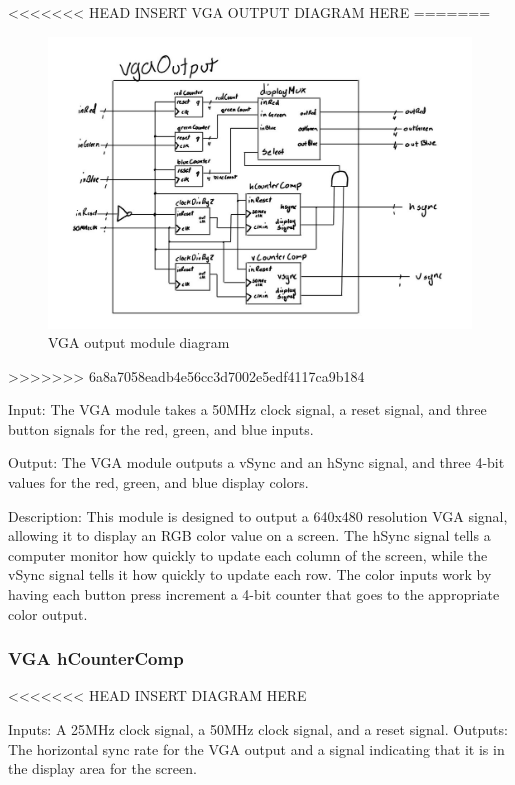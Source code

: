\documentclass[a4paper]{article}
\begin{document}
<<<<<<< HEAD
INSERT VGA OUTPUT DIAGRAM HERE
=======
\begin{figure}[H]
    \includegraphics[width=0.8 \linewidth]{images/vgaOutput.JPG}
    \caption{VGA output module diagram}
    \label{vgaOutputDiagram}
\end{figure}
>>>>>>> 6a8a7058eadb4e56cc3d7002e5edf4117ca9b184

Input: The VGA module takes a 50MHz clock signal, a reset signal, and three button signals for the red, green, and blue inputs.

Output: The VGA module outputs a vSync and an hSync signal, and three 4-bit values for the red, green, and blue display colors.

Description: This module is designed to output a 640x480 resolution VGA signal, allowing it to display an RGB color value on a screen. The hSync signal tells a computer monitor how quickly to update each column of the screen, while the vSync signal tells it how quickly to update each row. The color inputs work by having each button press increment a 4-bit counter that goes to the appropriate color output.

\subsubsection{VGA hCounterComp}

<<<<<<< HEAD
INSERT DIAGRAM HERE

Inputs: A 25MHz clock signal, a 50MHz clock signal, and a reset signal.
Outputs: The horizontal sync rate for the VGA output and a signal indicating that it is in the display area for the screen.
\end{document}
